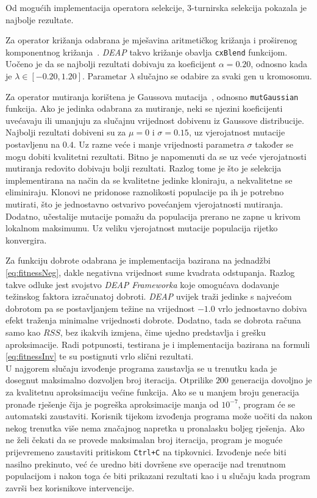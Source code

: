 \documentclass[times, utf8, seminar, numeric]{fer}
\begin{document}
Od mogućih implementacija operatora selekcije, $3$-turnirska selekcija pokazala je najbolje rezultate.

Za operator križanja odabrana je mješavina aritmetičkog križanja i proširenog komponentnog križanja~\cite{Cupic}.
\textit{DEAP} takvo križanje obavlja \texttt{cxBlend} funkcijom.
Uočeno je da se najbolji rezultati dobivaju za koeficijent $\alpha = 0.20$, odnosno kada je $\lambda \in \left[ -0.20, 1.20 \right]$.
Parametar $\lambda$ slučajno se odabire za svaki gen u kromosomu.

Za operator mutiranja korištena je Gaussova mutacija~\cite{WikiMutation}, odnosno \texttt{mutGaussian} funkcija.
Ako je jedinka odabrana za mutiranje, neki se njezini koeficijenti uvećavaju ili umanjuju za slučajnu vrijednost dobivenu iz Gaussove distribucije.
Najbolji rezultati dobiveni su za $\mu = 0$ i $\sigma = 0.15$, uz vjerojatnost mutacije postavljenu na $0.4$.
Uz razne veće i manje vrijednosti parametra $\sigma$ također se mogu dobiti kvalitetni rezultati.
Bitno je napomenuti da se uz veće vjerojatnosti mutiranja redovito dobivaju bolji rezultati.
Razlog tome je što je selekcija implementirana na način da se kvalitetne jedinke kloniraju, a nekvalitetne se eliminiraju.
Klonovi ne pridonose raznolikosti populacije pa ih je potrebno mutirati, što je jednostavno ostvarivo povećanjem vjerojatnosti mutiranja.
Dodatno, učestalije mutacije pomažu da populacija prerano ne zapne u krivom lokalnom maksimumu.
Uz veliku vjerojatnost mutacije populacija rijetko konvergira.

Za funkciju dobrote odabrana je implementacija bazirana na jednadžbi \eqref{eq:fitnessNeg}, dakle negativna vrijednost sume kvadrata odstupanja.
Razlog takve odluke jest svojstvo \textit{DEAP Frameworka} koje omogućava dodavanje težinskog faktora izračunatoj dobroti.
\textit{DEAP} uvijek traži jedinke s najvećom dobrotom pa se postavljanjem težine na vrijednost $-1.0$ vrlo jednostavno dobiva efekt traženja minimalne vrijednosti dobrote.
Dodatno, tada se dobrota računa samo kao $RSS$, bez ikakvih izmjena, čime ujedno predstavlja i grešku aproksimacije.
Radi potpunosti, testirana je i implementacija bazirana na formuli \eqref{eq:fitnessInv} te su postignuti vrlo slični rezultati.\\

U najgorem slučaju izvođenje programa zaustavlja se u trenutku kada je dosegnut maksimalno dozvoljen broj iteracija.
Otprilike $200$ generacija dovoljno je za kvalitetnu aproksimaciju većine funkcija.
Ako se u manjem broju generacija pronađe rješenje čija je pogreška aproksimacije manja od $10^{-7}$, program će se automatski zaustaviti.
Korisnik tijekom izvođenja programa može uočiti da nakon nekog trenutka više nema značajnog napretka u pronalasku boljeg rješenja.
Ako ne želi čekati da se provede maksimalan broj iteracija, program je moguće prijevremeno zaustaviti pritiskom \texttt{Ctrl+C} na tipkovnici.
Izvođenje neće biti nasilno prekinuto, već će uredno biti dovršene sve operacije nad trenutnom populacijom i nakon toga će biti prikazani rezultati kao i u slučaju kada program završi bez korisnikove intervencije.
\end{document}
